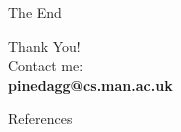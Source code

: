 \documentclass[17pt,mathserif]{beamer}
\begin{document}
   \begin{frame}{The End}
    \begin{center}
        \vspace*{-3em}
        {\Large Thank You!}\\
        \vspace*{0.5em}
        Contact me:\\[1em]
        {\Large \textbf{pinedagg@cs.man.ac.uk}}\\
    \end{center}
  \end{frame}


  {
    \changefontsizes{10pt}
    \begin{frame}{References}
      \vspace*{-3em}
      \printbibliography
     
    \end{frame}
  }
\end{document}
